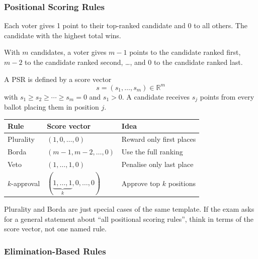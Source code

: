 \separator

\subsubsection{Positional Scoring Rules}

\begin{defbox}[Plurality]
Each voter gives 1 point to their top-ranked candidate and 0 to all others. The candidate with the highest total wins.
\end{defbox}

\begin{defbox}
With $m$ candidates, a voter gives $m-1$ points to the candidate ranked first, $m-2$ to the candidate ranked second, \ldots, and $0$ to the candidate ranked last.
\end{defbox}

\begin{defbox}
A PSR is defined by a score vector
\[
  s = (s_1,\ldots,s_m) \in \mathbb{R}^m
\]
with $s_1 \geq s_2 \geq \cdots \geq s_m = 0$ and $s_1 > 0$. A candidate receives $s_j$ points from every ballot placing them in position $j$.
\end{defbox}

\begin{center}
\renewcommand{\arraystretch}{1.25}
\begin{tabular}{@{}lll@{}}
\toprule
\textbf{Rule} & \textbf{Score vector} & \textbf{Idea} \\
\midrule
Plurality & $(1,0,\ldots,0)$ & Reward only first places \\
Borda & $(m-1,m-2,\ldots,0)$ & Use the full ranking \\
Veto & $(1,\ldots,1,0)$ & Penalise only last place \\
$k$-approval & $(\underbrace{1,\ldots,1}_{k},0,\ldots,0)$ & Approve top $k$ positions \\
\bottomrule
\end{tabular}
\end{center}

\begin{tipbox}
Plurality and Borda are just special cases of the same template. If the exam asks for a general statement about ``all positional scoring rules'', think in terms of the score vector, not one named rule.
\end{tipbox}

\separator

\subsubsection{Elimination-Based Rules}

